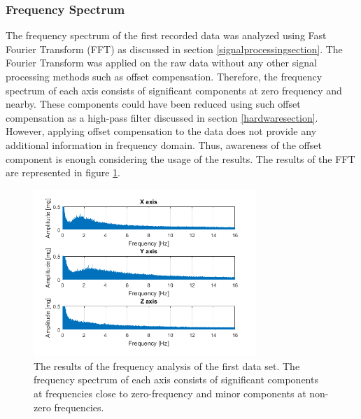 \documentclass[english,12pt,a4paper,pdftex,elec,utf8]{aaltothesis}
\begin{document}
\subsubsection{Frequency Spectrum}

The frequency spectrum of the first recorded data was analyzed using Fast Fourier Transform (FFT) as discussed in section \ref{signalprocessingsection}. The Fourier Transform was applied on the raw data without any other signal processing methods such as offset compensation. Therefore, the frequency spectrum of each axis consists of significant components at zero frequency and nearby. These components could have been reduced using such offset compensation as a high-pass filter discussed in section \ref{hardwaresection}. However, applying offset compensation to the data does not provide any additional information in frequency domain. Thus, awareness of the offset component is enough considering the usage of the results. The results of the FFT are represented in figure \ref{frequenyspectrumfigure}.

\begin{figure}[h]
\centering
\includegraphics[width = 0.75\textwidth]{figures/frequencyanalysis2.png}
\caption{The results of the frequency analysis of the first data set. The frequency spectrum of each axis consists of significant components at frequencies close to zero-frequency and minor components at non-zero frequencies.} \label{frequenyspectrumfigure}
\end{figure}
\end{document}
